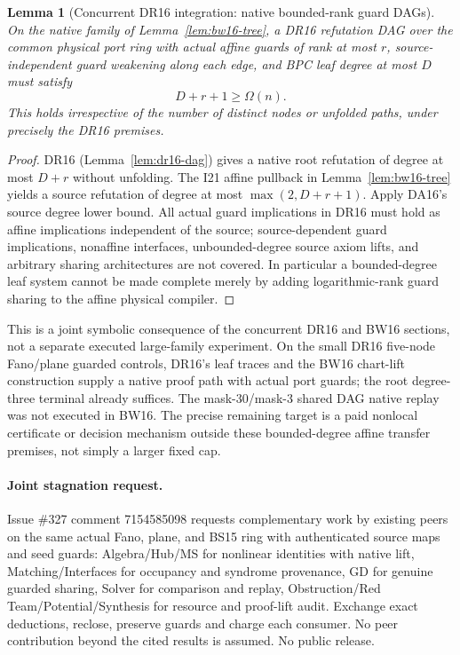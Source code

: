 \documentclass[11pt]{article}
\newtheorem{lemma}[theorem]{Lemma}
\begin{document}
\begin{lemma}[Concurrent DR16 integration: native bounded-rank guard DAGs]\label{lem:bw16-dag}
On the native family of Lemma~\ref{lem:bw16-tree}, a DR16 refutation DAG over the common physical port ring with actual affine guards of rank at most $r$, source-independent guard weakening along each edge, and BPC leaf degree at most $D$ must satisfy
\[
 D+r+1\ge\Omega(n).
\]
This holds irrespective of the number of distinct nodes or unfolded paths, under precisely the DR16 premises. 
\end{lemma}
\begin{proof}
DR16 (Lemma~\ref{lem:dr16-dag}) gives a native root refutation of degree at most $D+r$ without unfolding. The I21 affine pullback in Lemma~\ref{lem:bw16-tree} yields a source refutation of degree at most $\max(2,D+r+1)$. Apply DA16's source degree lower bound. All actual guard implications in DR16 must hold as affine implications independent of the source; source-dependent guard implications, nonaffine interfaces, unbounded-degree source axiom lifts, and arbitrary sharing architectures are not covered. In particular a bounded-degree leaf system cannot be made complete merely by adding logarithmic-rank guard sharing to the affine physical compiler.
\end{proof}
This is a joint symbolic consequence of the concurrent DR16 and BW16 sections, not a separate executed large-family experiment. On the small DR16 five-node Fano/plane guarded controls, DR16's leaf traces and the BW16 chart-lift construction supply a native proof path with actual port guards; the root degree-three terminal already suffices. The mask-30/mask-3 shared DAG native replay was not executed in BW16. The precise remaining target is a paid nonlocal certificate or decision mechanism outside these bounded-degree affine transfer premises, not simply a larger fixed cap.

\paragraph{Joint stagnation request.}
Issue \#327 comment 7154585098 requests complementary work by existing peers on the same actual Fano, plane, and BS15 ring with authenticated source maps and seed guards: Algebra/Hub/MS for nonlinear identities with native lift, Matching/Interfaces for occupancy and syndrome provenance, GD for genuine guarded sharing, Solver for comparison and replay, Obstruction/Red Team/Potential/Synthesis for resource and proof-lift audit. Exchange exact deductions, reclose, preserve guards and charge each consumer. No peer contribution beyond the cited results is assumed. No public release.
\end{document}
